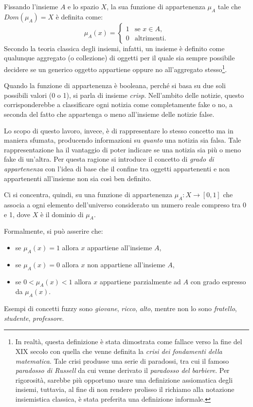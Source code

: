 \documentclass[12pt]{report}
\theoremstyle{definition}
\begin{document}
Fissando l'insieme $A$ e lo spazio $X$, la sua funzione di appartenenza $\mu_A$ tale che $Dom(\mu_A) = X$ è definita come:
\begin{equation}
    \mu_A(x)= \begin{cases} 1 & \mbox{se } x \in A, \\ 0 & \mbox{altrimenti.} \end{cases}
\end{equation}
Secondo la teoria classica degli insiemi, infatti, un insieme è definito come qualunque aggregato (o collezione) di oggetti per il quale sia sempre possibile decidere se un generico oggetto appartiene oppure no all'aggregato stesso\footnote{In realtà, questa definizione è stata dimostrata come fallace verso la fine del XIX secolo con quella che venne definita la \textit{crisi dei fondamenti della matematica}. Tale crisi produsse una serie di paradossi, tra cui il famoso \textit{paradosso di Russell} da cui venne derivato il \textit{paradosso del barbiere}. Per rigorosità, sarebbe più opportuno usare una definizione assiomatica degli insiemi, tuttavia, al fine di non rendere prolisso il richiamo alla notazione insiemistica classica, è stata preferita una definizione informale.}.

Quando la funzione di appartenenza è booleana, perché si basa su due soli possibili valori (0 o 1), si parla di insieme \textit{crisp}. Nell'ambito delle notizie, questo corrisponderebbe a classificare ogni notizia come completamente fake o no, a seconda del fatto che appartenga o meno all'insieme delle notizie false.

Lo scopo di questo lavoro, invece, è di rappresentare lo stesso concetto ma in maniera sfumata, producendo informazioni su \textit{quanto} una notizia sia falsa.
Tale rappresentazione ha il vantaggio di poter indicare se una notizia sia più o meno fake di un'altra.
Per questa ragione si introduce il concetto di \textit{grado di appartenenza} con l'idea di base che il confine tra oggetti appartenenti e non appartenenti all'insieme non sia così ben definito.

Ci si concentra, quindi, su una funzione di appartenenza $\mu_A: X \rightarrow [0,1]$ che associa a ogni elemento dell'universo considerato un numero reale compreso tra 0 e 1, dove $X$ è il dominio di $\mu_A$.

Formalmente, si può asserire che:
\begin{itemize}
    \item se $\mu_A(x) = 1$ allora $x$ appartiene all'insieme $A$,
    \item se $\mu_A(x) = 0$ allora $x$ non appartiene all'insieme $A$,
    \item se $0 < \mu_A(x) < 1$ allora $x$ appartiene parzialmente ad $A$ con grado espresso da $\mu_A(x)$.
\end{itemize}
Esempi di concetti fuzzy sono \textit{giovane}, \textit{ricco}, \textit{alto}, mentre non lo sono \textit{fratello}, \textit{studente}, \textit{professore}.
\end{document}
